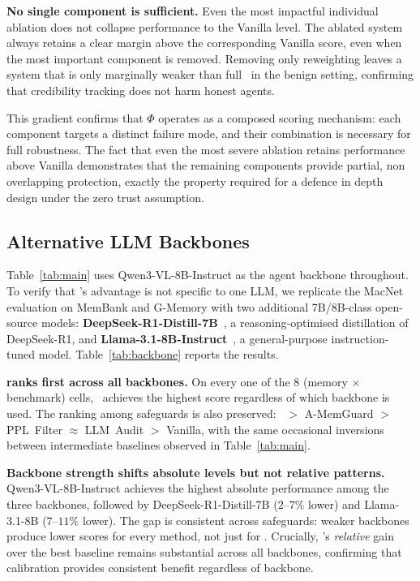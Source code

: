 \textbf{No single component is sufficient.}
Even the most impactful individual ablation does not collapse performance to the Vanilla level. The ablated system always retains a clear margin above the corresponding Vanilla score, even when the most important component is removed. Removing only reweighting leaves a system that is only marginally weaker than full \system\ in the benign setting, confirming that credibility tracking does not harm honest agents.

This gradient confirms that $\Phi$ operates as a composed scoring mechanism: each component targets a distinct failure mode, and their combination is necessary for full robustness. The fact that even the most severe ablation retains performance above Vanilla demonstrates that the remaining components provide partial, non overlapping protection, exactly the property required for a defence in depth design under the zero trust assumption.

\subsection{Alternative LLM Backbones}
\label{app:diff-backbone}

Table~\ref{tab:main} uses Qwen3-VL-8B-Instruct as the
agent backbone throughout.  To verify that \system's
advantage is not specific to one LLM, we replicate
the MacNet evaluation on MemBank and G-Memory with
two additional 7B/8B-class open-source models:
\textbf{DeepSeek-R1-Distill-7B}~\citep{guo2025deepseek},
a reasoning-optimised distillation of DeepSeek-R1,
and \textbf{Llama-3.1-8B-Instruct}~\citep{patterson2022carbon},
a general-purpose instruction-tuned model.
Table~\ref{tab:backbone} reports the results.



\textbf{\system ranks first across all backbones.}
On every one of the 8 (memory $\times$ benchmark)
cells, \system\ achieves the highest score regardless
of which backbone is used.  The ranking among
safeguards is also preserved: \system\ $>$
A-MemGuard $>$ PPL~Filter $\approx$ LLM~Audit $>$
Vanilla, with the same occasional inversions between
intermediate baselines observed in
Table~\ref{tab:main}.

\textbf{Backbone strength shifts absolute levels
but not relative patterns.}
Qwen3-VL-8B-Instruct achieves the highest absolute performance
among the three backbones, followed by
DeepSeek-R1-Distill-7B ($2$--$7\%$ lower) and
Llama-3.1-8B ($7$--$11\%$ lower).  The gap
is consistent across safeguards: weaker backbones
produce lower scores for every method, not just for
\system.  Crucially, \system's \emph{relative} gain
over the best baseline remains substantial across
all backbones, confirming that calibration
provides consistent benefit regardless of backbone.


